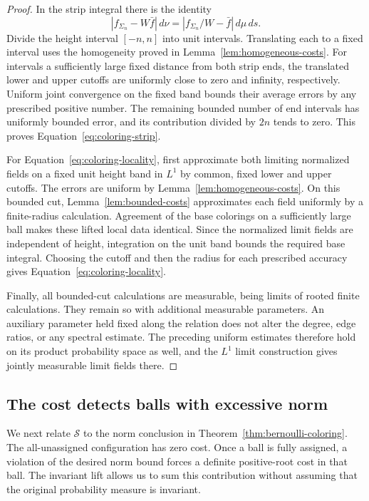 \begin{proof}
In the strip integral there is the identity
\[
 |f_{\Sigma_n}-W\bar f|\,d\nu
    =|f_{\Sigma_n}/W-\bar f|\,d\mu\,ds.
\]
Divide the height interval $[-n,n]$ into unit intervals.  Translating each
to a fixed interval uses the homogeneity proved in
Lemma~\ref{lem:homogeneous-costs}.  For intervals a sufficiently large
fixed distance from both strip ends, the translated lower and upper
cutoffs are uniformly close to zero and infinity, respectively.  Uniform
joint convergence on the fixed band bounds their average errors by any
prescribed positive number.  The remaining bounded number of end
intervals has uniformly bounded error, and its contribution divided by
$2n$ tends to zero.  This proves Equation~\eqref{eq:coloring-strip}.

For Equation~\eqref{eq:coloring-locality}, first approximate both limiting
normalized fields on a fixed unit height band in $L^1$ by common, fixed
lower and upper cutoffs.  The errors are uniform by
Lemma~\ref{lem:homogeneous-costs}.  On this bounded cut,
Lemma~\ref{lem:bounded-costs} approximates each field uniformly by a
finite-radius calculation.  Agreement of the base colorings on a
sufficiently large ball makes these lifted local data identical.  Since
the normalized limit fields are independent of height, integration on
the unit band bounds the required base integral.  Choosing the cutoff
and then the radius for each prescribed accuracy gives
Equation~\eqref{eq:coloring-locality}.

Finally, all bounded-cut calculations are measurable, being limits of
rooted finite calculations.  They remain so with additional measurable
parameters.  An auxiliary parameter held fixed along the relation does
not alter the degree, edge ratios, or any spectral estimate.  The
preceding uniform estimates therefore hold on its product probability
space as well, and the $L^1$ limit construction gives jointly measurable
limit fields there.
\end{proof}

\subsection{The cost detects balls with excessive norm}

We next relate $\mathcal S$ to the norm conclusion in
Theorem~\ref{thm:bernoulli-coloring}.  The all-unassigned configuration has
zero cost.  Once a ball is fully assigned, a violation of the desired norm
bound forces a definite positive-root cost in that ball.  The invariant
lift allows us to sum this contribution without assuming that the
original probability measure is invariant.

